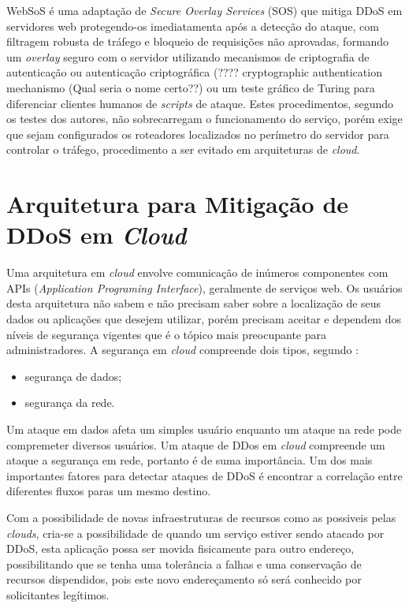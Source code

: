\documentclass[a4paper, 12pt]{article}
\begin{document}
WebSoS \cite{Stavrou:2005:WOS:1090583.1648614} é uma adaptação de \emph{Secure Overlay Services} (SOS) \cite{Keromytis:2002:SSO:964725.633032} que mitiga DDoS em servidores web protegendo-os imediatamenta após a detecção do ataque, com filtragem robusta de tráfego e bloqueio de requisições não aprovadas, formando um \emph{overlay} seguro com o servidor utilizando mecanismos de criptografia de autenticação ou autenticação criptográfica (???? cryptographic authentication mechanismo (Qual seria o nome certo??) ou um teste gráfico de Turing \cite{Dietrich00analyzingdistributed} para diferenciar clientes humanos de \emph{scripts} de ataque. Estes procedimentos, segundo os testes dos autores, não sobrecarregam o funcionamento do serviço, porém exige que sejam configurados os roteadores localizados no perímetro do servidor para controlar o tráfego, procedimento a ser evitado em arquiteturas de \emph{cloud}.
 



\section{Arquitetura para Mitigação de DDoS em \emph{Cloud}}


Uma arquitetura em \emph{cloud} envolve comunicação de inúmeros componentes com APIs (\emph{Application Programing Interface}), geralmente de serviços web. Os usuários desta arquitetura não sabem e não precisam saber sobre a localização de seus dados ou aplicações que desejem utilizar, porém precisam aceitar e dependem  dos níveis de segurança vigentes que é o tópico mais preocupante para administradores.
A segurança em \emph{cloud} compreende dois tipos, segundo \cite{Dhage:2011:IDS:1980022.1980076}:  
\begin{itemize}
\item segurança de dados;
\item segurança da rede.
\end{itemize}

Um ataque em dados afeta um simples usuário enquanto um ataque na rede pode compremeter diversos usuários. Um ataque de DDos em \emph{cloud} compreende um ataque a segurança em rede, portanto é de suma importância. 
Um dos mais importantes fatores para detectar ataques de DDoS é encontrar a correlação entre diferentes fluxos paras um mesmo destino.

Com a possibilidade de novas infraestruturas de recursos como as possiveis pelas \emph{clouds}, cria-se a possibilidade de quando um serviço estiver sendo atacado por DDoS, esta aplicação possa ser movida fisicamente para outro endereço, possibilitando que se tenha uma tolerância a falhas e uma conservação de recursos dispendidos, pois este novo endereçamento só será conhecido por solicitantes legítimos.
\end{document}
